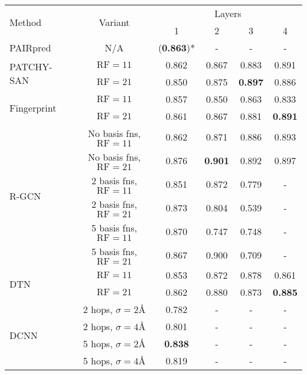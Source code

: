 \begin{table}
	\begin{center}
		\begin{tabular}{l c c c c c }
			\toprule
			
			\multirow{2}{*}{Method} & \multirow{2}{*}{Variant} &  \multicolumn{4}{c}{Layers} \\
											 & & 1 & 2 & 3 & 4 \\
			\midrule
			PAIRpred~\cite{minhas2014}   & N/A  & (\textbf{0.863})* & - & - & - \\

			\midrule
			\multirow{2}{*}{PATCHY-SAN~\cite{niepert2016}}  & $\text{RF}=11$ & 0.862 & 0.867 & 0.883 & 0.891 \\
										 & $\text{RF}=21$ & 0.850 & 0.875 & \textbf{0.897} & 0.886 \\
			\midrule
			\multirow{2}{*}{Fingerprint~\cite{duvenaud2015}}  & $\text{RF}=11$ & 0.857 & 0.850 & 0.863 & 0.833 \\
										  & $\text{RF}=21$ & 0.861 & 0.867 & 0.881 & \textbf{0.891} \\
			\midrule

			\multirow{6}{*}{R-GCN~\cite{schlichtkrull2017}} & No basis fns, $\text{RF}=11$ & 0.862 & 0.871 & 0.886 & 0.893 \\
								   & No basis fns, $\text{RF}=21$ & 0.876 & \textbf{0.901} & 0.892 & 0.897 \\
								   & 2 basis fns, $\text{RF}=11$ & 0.851 & 0.872 & 0.779 & -	   \\
								   & 2 basis fns, $\text{RF}=21$ & 0.873 & 0.804 & 0.539 & -     \\
								   & 5 basis fns, $\text{RF}=11$ & 0.870 & 0.747 & 0.748 & -	   \\
								   & 5 basis fns, $\text{RF}=21$ & 0.867 & 0.900 & 0.709 & -     \\
			\midrule
			\multirow{2}{*}{DTN~\cite{schutt2017}}& $\text{RF}=11$ & 0.853 & 0.872 & 0.878 & 0.861 \\
			& $\text{RF}=21$ & 0.862 & 0.880 & 0.873 & \textbf{0.885} \\
			\midrule
			\multirow{4}{*}{DCNN~\cite{atwood2016}} & 2 hops, $\sigma=2$\AA{} & 0.782 & - & - & - \\
										& 2 hops, $\sigma=4$\AA{} & 0.801 & - & - & - \\
										& 5 hops, $\sigma=2$\AA{} & \textbf{0.838} & - & - & - \\ 
										& 5 hops, $\sigma=4$\AA{} & 0.819 & - & - & - \\ 
												  

\end{tabular}
\end{center}
\end{table}

